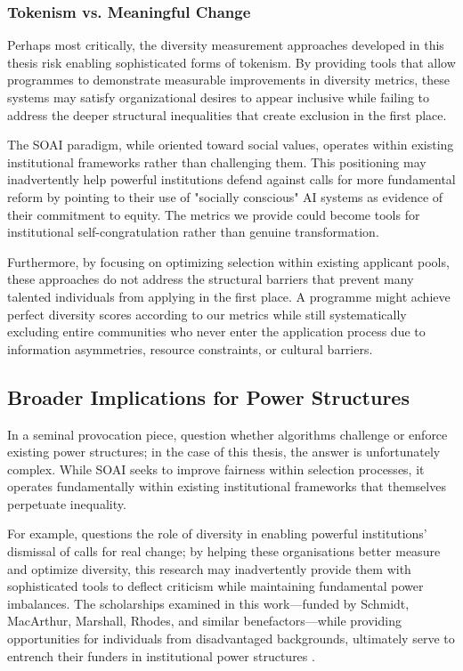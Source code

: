 \subsubsection{Tokenism vs. Meaningful Change}
Perhaps most critically, the diversity measurement approaches developed in this thesis risk enabling sophisticated forms of tokenism. By providing tools that allow programmes to demonstrate measurable improvements in diversity metrics, these systems may satisfy organizational desires to appear inclusive while failing to address the deeper structural inequalities that create exclusion in the first place.

The SOAI paradigm, while oriented toward social values, operates within existing institutional frameworks rather than challenging them. This positioning may inadvertently help powerful institutions defend against calls for more fundamental reform by pointing to their use of "socially conscious" AI systems as evidence of their commitment to equity. The metrics we provide could become tools for institutional self-congratulation rather than genuine transformation.

Furthermore, by focusing on optimizing selection within existing applicant pools, these approaches do not address the structural barriers that prevent many talented individuals from applying in the first place. A programme might achieve perfect diversity scores according to our metrics while still systematically excluding entire communities who never enter the application process due to information asymmetries, resource constraints, or cultural barriers.

\subsection{Broader Implications for Power Structures}
In a seminal provocation piece, \textcite{Barocas_Hood_Ziewitz_2013} question whether algorithms challenge or enforce existing power structures; in the case of this thesis, the answer is unfortunately complex. While SOAI seeks to improve fairness within selection processes, it operates fundamentally within existing institutional frameworks that themselves perpetuate inequality.

For example, \textcite{Ahmed_2012} questions the role of diversity in enabling powerful institutions' dismissal of calls for real change; by helping these organisations better measure and optimize diversity, this research may inadvertently provide them with sophisticated tools to deflect criticism while maintaining fundamental power imbalances. The scholarships examined in this work—funded by Schmidt, MacArthur, Marshall, Rhodes, and similar benefactors—while providing opportunities for individuals from disadvantaged backgrounds, ultimately serve to entrench their funders in institutional power structures \cite{Ziegler_2008}.

